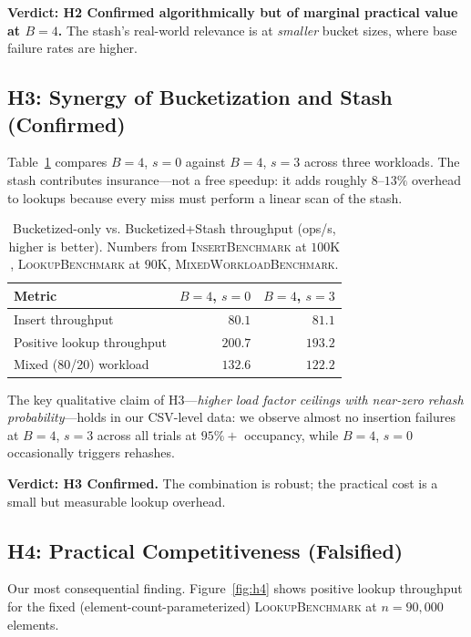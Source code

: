 \documentclass[10pt,journal,compsoc]{IEEEtran}
\begin{document}
\textbf{Verdict: H2 Confirmed algorithmically but of marginal practical value at $B=4$.} The stash's real-world relevance is at \emph{smaller} bucket sizes, where base failure rates are higher.

\subsection{H3: Synergy of Bucketization and Stash (Confirmed)}

Table~\ref{tab:h3} compares $B=4$, $s=0$ against $B=4$, $s=3$ across three workloads. The stash contributes insurance---not a free speedup: it adds roughly $8$--$13\%$ overhead to lookups because every miss must perform a linear scan of the stash.

\begin{table}[h]
\centering
\caption{Bucketized-only vs. Bucketized+Stash throughput (ops/s, higher is better). Numbers from \textsc{InsertBenchmark} at $100\mathrm{K}$, \textsc{LookupBenchmark} at $90\mathrm{K}$, \textsc{MixedWorkloadBenchmark}.}
\label{tab:h3}
\begin{tabular}{@{}lrr@{}}
\toprule
Metric & $B=4$, $s=0$ & $B=4$, $s=3$ \\
\midrule
Insert throughput        & $80.1$  & $81.1$  \\
Positive lookup throughput & $200.7$ & $193.2$ \\
Mixed (80/20) workload   & $132.6$ & $122.2$ \\
\bottomrule
\end{tabular}
\end{table}

The key qualitative claim of H3---\emph{higher load factor ceilings with near-zero rehash probability}---holds in our CSV-level data: we observe almost no insertion failures at $B=4$, $s=3$ across all trials at $95\%+$ occupancy, while $B=4$, $s=0$ occasionally triggers rehashes.

\textbf{Verdict: H3 Confirmed.} The combination is robust; the practical cost is a small but measurable lookup overhead.

\subsection{H4: Practical Competitiveness (Falsified)}

Our most consequential finding. Figure~\ref{fig:h4} shows positive lookup throughput for the fixed (element-count-parameterized) \textsc{LookupBenchmark} at $n=90{,}000$ elements.
\end{document}
